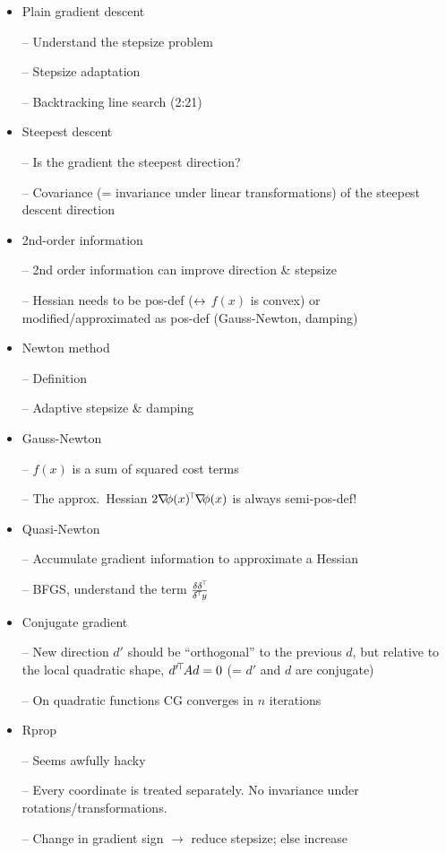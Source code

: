 \begin{itemize}
\item Plain gradient descent

-- Understand the stepsize problem

-- Stepsize adaptation

-- Backtracking line search (2:21)

\item Steepest descent

-- Is the gradient the steepest direction?

-- Covariance (= invariance under linear transformations) of the
steepest descent direction

\item 2nd-order information

-- 2nd order information can improve direction \& stepsize

-- Hessian needs to be pos-def ($\leftrightarrow$ $f(x)$ is convex) or
modified/approximated as pos-def (Gauss-Newton, damping)

\item Newton method

-- Definition

-- Adaptive stepsize \& damping

\item Gauss-Newton

-- $f(x)$ is a sum of squared cost terms

-- The approx.\ Hessian $2{\nabla_{\!\!}}\phi(x)^{\!\top\!} {\nabla_{\!\!}}\phi(x)$ is always
semi-pos-def!

\item Quasi-Newton

-- Accumulate gradient information to approximate a Hessian

-- BFGS, understand the term $\frac{\delta \delta^{\!\top\!}}{\delta^{\!\top\!} y}$


\item Conjugate gradient

-- New direction $d'$ should be ``orthogonal'' to the previous $d$,
but relative to the local quadratic shape, $d'^{\!\top\!} A d = 0$ (= $d'$ and
$d$ are conjugate)

-- On quadratic functions CG converges in $n$ iterations

\item Rprop

-- Seems awfully hacky

-- Every coordinate is treated separately. No invariance under
rotations/transformations.

-- Change in gradient sign $\to$ reduce stepsize; else increase


\end{itemize}
